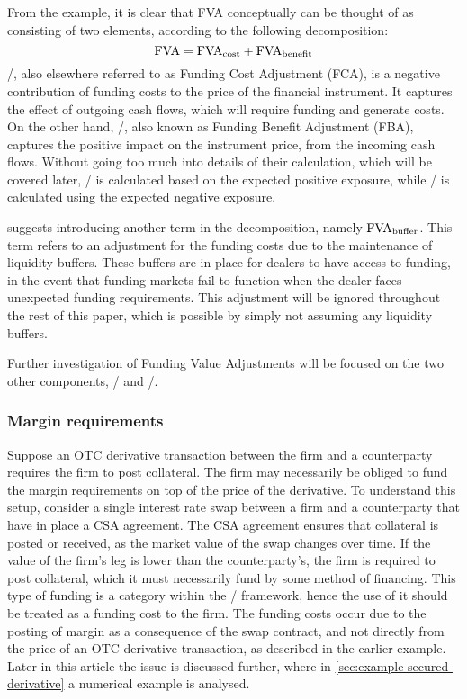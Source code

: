 \documentclass[main.tex]{subfiles}
\begin{document}
        From the example, it is clear that FVA conceptually can be thought of 
        as consisting of two elements, according to the following decomposition:
        \begin{equation}
            \FVA/ = \FCA/ + \FBA/
        \end{equation}
        \FCA/, also elsewhere referred to as Funding Cost Adjustment (FCA), 
        is a negative contribution of funding costs to the price of the financial instrument.
        It captures the effect of outgoing cash flows, which will require funding and generate costs.
        On the other hand, \FBA/, also known as Funding Benefit Adjustment (FBA), 
        captures the positive impact on the instrument price, from the incoming cash flows.
        Without going too much into details of their calculation, which will be covered later,
        \FCA/ is calculated based on the expected positive exposure, 
        while \FBA/ is calculated using the expected negative exposure. 

        \textcite{KPMGFVA} suggests introducing another term in the decomposition, namely
        $\FVA/_{\text{buffer}}$.
        This term refers to an adjustment for the funding costs
        due to the maintenance of liquidity buffers. 
        These buffers are in place for dealers to have access to funding, in the event
        that funding markets fail to function when the dealer faces unexpected funding requirements.
        This adjustment will be ignored throughout the rest of this paper, 
        which is possible by simply not assuming any liquidity buffers. 
        
        Further investigation of Funding Value Adjustments will be focused on the two other components,
        \FCA/ and \FBA/.

        \subsubsection*{Margin requirements}
            Suppose an OTC derivative transaction between the firm and a counterparty requires the firm to post collateral.
            The firm may necessarily be obliged to fund the margin requirements on top of the price of the derivative.
            To understand this setup,
            consider a single interest rate swap between a firm and a counterparty that have in place a CSA agreement.
            The CSA agreement ensures that collateral is posted or received,
            as the market value of the swap changes over time.
            If the value of the firm's leg is lower than the counterparty's,
            the firm is required to post collateral, 
            which it must necessarily fund by some method of financing.
            This type of funding is a category within the \FVA/ framework, 
            hence the use of it should be treated as a funding cost to the firm.
            The funding costs occur due to the posting of margin as a consequence of the swap contract,
            and not directly from the price of an OTC derivative transaction,
            as described in the earlier example.
            Later in this article the issue is discussed further, 
            where in \cref{sec:example-secured-derivative} a numerical example is analysed.
            
\end{document}
